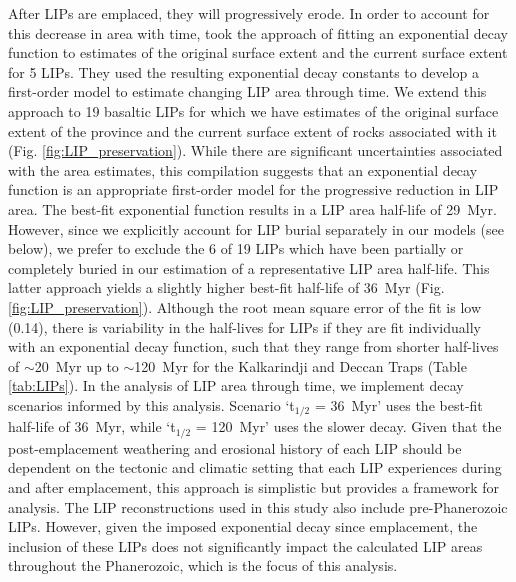 \documentclass[11pt,letterpaper]{article}
\begin{document}
After LIPs are emplaced, they will progressively erode. In order to account for this decrease in area with time, \citet{Godderis2017a} took the approach of fitting an exponential decay function to estimates of the original surface extent and the current surface extent for 5 LIPs. They used the resulting exponential decay constants to develop a first-order model to estimate changing LIP area through time. We extend this approach to 19 basaltic LIPs for which we have estimates of the original surface extent of the province and the current surface extent of rocks associated with it (Fig. \ref{fig:LIP_preservation}). While there are significant uncertainties associated with the area estimates, this compilation suggests that an exponential decay function is an appropriate first-order model for the progressive reduction in LIP area. The best-fit exponential function results in a LIP area half-life of 29~Myr. However, since we explicitly account for LIP burial separately in our models (see below), we prefer to exclude the 6 of 19 LIPs which have been partially or completely buried in our estimation of a representative LIP area half-life. This latter approach yields a slightly higher best-fit half-life of 36~Myr (Fig. \ref{fig:LIP_preservation}). Although the root mean square error of the fit is low (0.14), there is variability in the half-lives for LIPs if they are fit individually with an exponential decay function, such that they range from shorter half-lives of $\sim$20~Myr up to $\sim$120~Myr for the Kalkarindji and Deccan Traps (Table \ref{tab:LIPs}). In the analysis of LIP area through time, we implement decay scenarios informed by this analysis. Scenario `t$_{1/2}$ = 36~Myr' uses the best-fit half-life of 36~Myr, while `t$_{1/2}$ = 120~Myr' uses the slower decay. Given that the post-emplacement weathering and erosional history of each LIP should be dependent on the tectonic and climatic setting that each LIP experiences during and after emplacement, this approach is simplistic but provides a framework for analysis. The LIP reconstructions used in this study also include pre-Phanerozoic LIPs. However, given the imposed exponential decay since emplacement, the inclusion of these LIPs does not significantly impact the calculated LIP areas throughout the Phanerozoic, which is the focus of this analysis.
\end{document}

